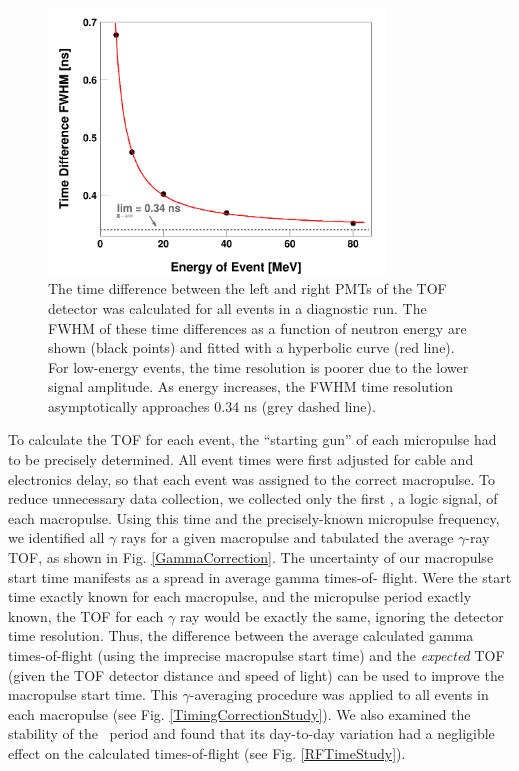 \begin{figure}[tb]
    \centering
    \includegraphics[width=0.8\textwidth]{figures/DifferenceThresholdsFit.png}
    \caption[Intrinsic time resolution of time-of-flight detector as a function
    of signal amplitude]
    {
        The time difference between the left and right PMTs
        of the TOF detector was calculated for all events in a diagnostic run.
        The FWHM of these time differences as a function of
        neutron energy are shown (black points) and fitted with a hyperbolic
        curve (red line). For low-energy
        events, the time resolution is poorer due to the lower signal amplitude.
        As energy increases, the FWHM time resolution asymptotically approaches 0.34
        ns (grey dashed line).
    }
    \label{DifferenceThresholdsFit}
\end{figure}

To calculate the TOF for each event, the ``starting gun'' of each
micropulse had to be precisely determined. All event times were first adjusted for cable and 
electronics delay, so that each event was assigned to the correct macropulse.
To reduce unnecessary data collection, we collected only the first \tZero, a
logic signal, of each macropulse. 
Using this time and the precisely-known micropulse frequency, we identified all $\gamma$ rays 
for a given macropulse and tabulated
the average $\gamma$-ray TOF, as shown in Fig. \ref{GammaCorrection}.
The uncertainty of our macropulse start time manifests as a spread in average gamma times-of-
flight. Were the start time exactly known for each macropulse, and the
micropulse period exactly known, the TOF for each $\gamma$ ray would be
exactly the same, ignoring the detector time resolution. Thus, the difference between the 
average calculated gamma times-of-flight (using the imprecise macropulse start
time) and the \textit{expected} TOF (given the TOF detector distance and speed of light)
can be used to improve the macropulse start time. This $\gamma$-averaging
procedure was applied to all events in each macropulse (see Fig.
\ref{TimingCorrectionStudy}). We also examined the stability of the \tZero\
period and found that its day-to-day variation had a negligible effect on the
calculated times-of-flight (see Fig. \ref{RFTimeStudy}).

